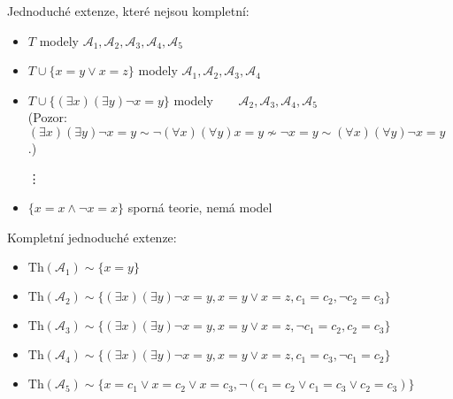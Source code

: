 \begin{problem}
\begin{solution}
\begin{enumerate}[(a)]
            Jednoduché extenze, které nejsou kompletní:
            \begin{itemize}
                \item $T$ \hfill modely $\mathcal A_1,\mathcal A_2,\mathcal A_3,\mathcal A_4,\mathcal A_5$
                \item $T\cup\{x=y\lor x=z\}$ \hfill modely $\mathcal A_1,\mathcal A_2,\mathcal A_3,\mathcal A_4\phantom{,\mathcal A_5}$
                \item $T\cup\{(\exists x)(\exists y)\neg x=y\}$ \hfill modely $\phantom{\mathcal A_1,}\mathcal A_2,\mathcal A_3,\mathcal A_4,\mathcal A_5$\\
                (Pozor: $(\exists x)(\exists y)\neg x=y\sim\neg(\forall x)(\forall y)x=y\not\sim\neg x=y\sim(\forall x)(\forall y)\neg x=y$.)
                
                \item[\vdots]
                
                \item $\{x=x\land\neg x=x\}$ \hfill sporná teorie, nemá model
            \end{itemize}

            Kompletní jednoduché extenze:
            \begin{itemize}
                \item $\mathrm{Th}(\mathcal A_1)\sim\{x=y\}$
                \item $\mathrm{Th}(\mathcal A_2)\sim\{(\exists x)(\exists y)\neg x=y,x=y\lor x=z,c_1=c_2,\neg c_2=c_3\}$
                \item $\mathrm{Th}(\mathcal A_3)\sim\{(\exists x)(\exists y)\neg x=y,x=y\lor x=z,\neg c_1=c_2,c_2=c_3\}$
                \item $\mathrm{Th}(\mathcal A_4)\sim\{(\exists x)(\exists y)\neg x=y,x=y\lor x=z,c_1=c_3,\neg c_1=c_2\}$
                \item $\mathrm{Th}(\mathcal A_5)\sim\{x=c_1 \vee x=c_2 \vee x=c_3,\neg (c_1=c_2\lor c_1=c_3\lor c_2=c_3)\}$
            \end{itemize}    
            

\end{enumerate}
\end{solution}
\end{problem}
